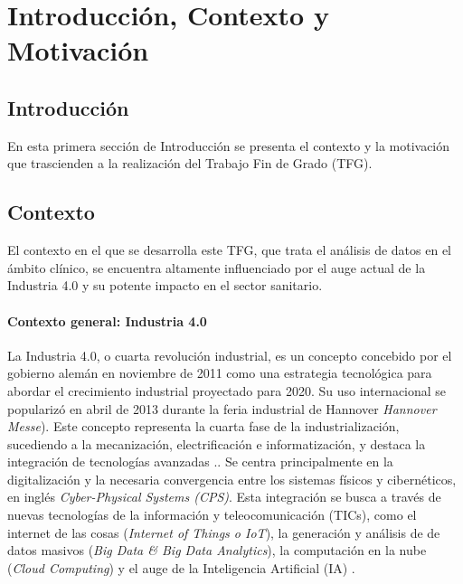 \chapter{Introducción, Contexto y Motivación}\label{cap:introduccion}


\section{Introducción}


En esta primera sección de Introducción se presenta el contexto y la motivación que trascienden a la realización del Trabajo Fin de Grado (TFG).

\section{Contexto}
 
El contexto en el que se desarrolla este TFG, que trata el análisis de datos en el ámbito clínico, se encuentra altamente influenciado por el auge actual de la Industria 4.0 y su potente impacto en el sector sanitario.


\subsubsection{Contexto general: Industria 4.0}

La Industria 4.0, o cuarta revolución industrial, es un concepto concebido por el gobierno alemán en noviembre de 2011 como una estrategia tecnológica para abordar el crecimiento industrial proyectado para 2020. Su uso internacional se popularizó en abril de 2013 durante la feria industrial de Hannover \textit{Hannover Messe}). Este concepto representa la cuarta fase de la industrialización, sucediendo a la mecanización, electrificación e informatización, y destaca la integración de tecnologías avanzadas \cite{lasi2014industry}..
Se centra principalmente en la digitalización y la necesaria convergencia entre los sistemas físicos y cibernéticos, en inglés \textit{Cyber-Physical Systems (CPS)}. Esta integración se busca a través de nuevas tecnologías de la información y teleocomunicación (TICs), como el internet de las cosas (\textit{Internet of Things o IoT}), la generación y análisis de de datos masivos (\textit{Big Data \& Big Data Analytics}), la computación en la nube (\textit{Cloud Computing}) y el auge de la Inteligencia Artificial (IA) \cite{lasi2014industry}.\cite{chen2020times}\cite{tortorella2020healthcare}


